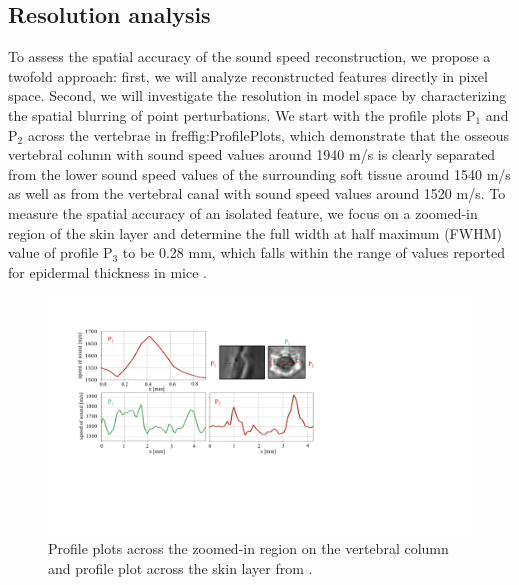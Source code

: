 \documentclass[12pt]{iopart}
\begin{document}
\subsection{Resolution analysis}
\label{subsec:resolution_analysis_results}
To assess the spatial accuracy of the sound speed reconstruction, we propose a twofold approach: first, we will analyze reconstructed features directly in pixel space. Second, we will investigate the resolution in model space by characterizing the spatial blurring of point perturbations. We start with the profile plots P$_1$ and P$_2$ across the vertebrae in fref{fig:ProfilePlots}, which demonstrate that the osseous vertebral column with sound speed values around 1940 m/s is clearly separated from the lower sound speed values of the surrounding soft tissue around 1540 m/s as well as from the vertebral canal with sound speed values around 1520 m/s. To measure the spatial accuracy of an isolated feature, we focus on a zoomed-in region of the skin layer and determine the full width at half maximum (FWHM) value of profile P$_3$ to be 0.28 mm, which falls within the range of values reported for epidermal thickness in mice \cite{Caetano_2016}. 
 \begin{figure}[!h]
    \centering
    \includegraphics[width=\linewidth]{figure6.pdf}
    \caption{Profile plots across the zoomed-in region on the vertebral column and profile plot across the skin layer from .}
    \label{fig:ProfilePlots}
\end{figure}
\end{document}
